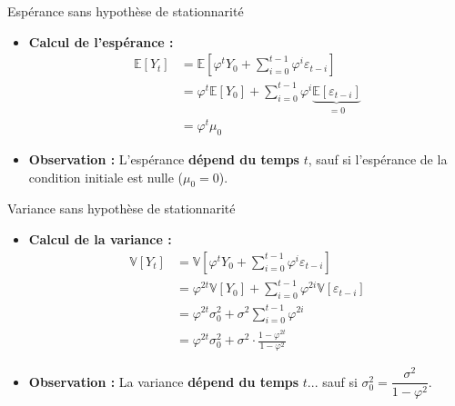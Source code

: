 \documentclass[11pt,aspectratio=169]{beamer}
\newcommand{\E}{\mathbb{E}}
\newcommand{\Var}{\mathbb{V}}
\begin{document}
\begin{frame}{Espérance sans hypothèse de stationnarité}

\begin{itemize}

\item \textbf{Calcul de l'espérance :}
\begin{align*}
\E[Y_t] &= \E\left[\varphi^t Y_0 + \sum_{i=0}^{t-1} \varphi^i \varepsilon_{t-i}\right] \\
&= \varphi^t \E[Y_0] + \sum_{i=0}^{t-1} \varphi^i \underbrace{\E[\varepsilon_{t-i}]}_{= 0} \\
&= \varphi^t \mu_0
\end{align*}

\item \textbf{Observation :} L'espérance \textbf{dépend du temps} $t$, sauf si l'espérance de la condition initiale est nulle ($\mu_0 = 0$).

\end{itemize}
\end{frame}

\begin{frame}{Variance sans hypothèse de stationnarité}

\begin{itemize}

\item \textbf{Calcul de la variance :}
\begin{align*}
\Var[Y_t] &= \Var\left[\varphi^t Y_0 + \sum_{i=0}^{t-1} \varphi^i \varepsilon_{t-i}\right] \\
&= \varphi^{2t} \Var[Y_0] + \sum_{i=0}^{t-1} \varphi^{2i} \Var[\varepsilon_{t-i}] \\
&= \varphi^{2t} \sigma_0^2 + \sigma^2 \sum_{i=0}^{t-1} \varphi^{2i} \\
&= \varphi^{2t} \sigma_0^2 + \sigma^2 \cdot \frac{1 - \varphi^{2t}}{1 - \varphi^2}
\end{align*}

\item \textbf{Observation :} La variance \textbf{dépend du temps} $t$... sauf si $\sigma_0^2 = \dfrac{\sigma^2}{1 - \varphi^2}$.

\end{itemize}
\end{frame}
\end{document}
